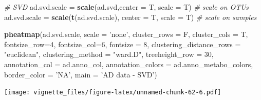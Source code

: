 \documentclass[]{book}
\newenvironment{Shaded}{\begin{snugshade}}{\end{snugshade}}
\newcommand{\KeywordTok}[1]{\textcolor[rgb]{0.13,0.29,0.53}{\textbf{#1}}}
\newcommand{\DataTypeTok}[1]{\textcolor[rgb]{0.13,0.29,0.53}{#1}}
\newcommand{\DecValTok}[1]{\textcolor[rgb]{0.00,0.00,0.81}{#1}}
\newcommand{\StringTok}[1]{\textcolor[rgb]{0.31,0.60,0.02}{#1}}
\newcommand{\CommentTok}[1]{\textcolor[rgb]{0.56,0.35,0.01}{\textit{#1}}}
\newcommand{\NormalTok}[1]{#1}
\begin{document}
\begin{Shaded}
\begin{Highlighting}[]
\CommentTok{# SVD}
\NormalTok{ad.svd.scale =}\StringTok{ }\KeywordTok{scale}\NormalTok{(ad.svd,}\DataTypeTok{center =}\NormalTok{ T, }\DataTypeTok{scale =}\NormalTok{ T) }\CommentTok{# scale on OTUs}
\NormalTok{ad.svd.scale =}\StringTok{ }\KeywordTok{scale}\NormalTok{(}\KeywordTok{t}\NormalTok{(ad.svd.scale), }\DataTypeTok{center =}\NormalTok{ T, }\DataTypeTok{scale =}\NormalTok{ T) }\CommentTok{# scale on samples}

\KeywordTok{pheatmap}\NormalTok{(ad.svd.scale, }
         \DataTypeTok{scale =} \StringTok{'none'}\NormalTok{, }
         \DataTypeTok{cluster_rows =}\NormalTok{ F, }
         \DataTypeTok{cluster_cols =}\NormalTok{ T, }
         \DataTypeTok{fontsize_row=}\DecValTok{4}\NormalTok{, }\DataTypeTok{fontsize_col=}\DecValTok{6}\NormalTok{,}
         \DataTypeTok{fontsize =} \DecValTok{8}\NormalTok{,}
         \DataTypeTok{clustering_distance_rows =} \StringTok{"euclidean"}\NormalTok{,}
         \DataTypeTok{clustering_method =} \StringTok{"ward.D"}\NormalTok{,}
         \DataTypeTok{treeheight_row =} \DecValTok{30}\NormalTok{,}
         \DataTypeTok{annotation_col =}\NormalTok{ ad.anno_col,}
         \DataTypeTok{annotation_colors =}\NormalTok{ ad.anno_metabo_colors,}
         \DataTypeTok{border_color =} \StringTok{'NA'}\NormalTok{,}
         \DataTypeTok{main =} \StringTok{'AD data - SVD'}\NormalTok{)}
\end{Highlighting}
\end{Shaded}

\texttt{[image: vignette\_files/figure-latex/unnamed-chunk-62-6.pdf]}
\end{document}
